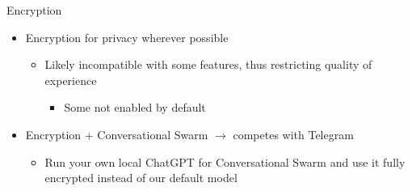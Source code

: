 \documentclass[aspectratio=169]{beamer}
\begin{document}
\begin{frame}{Encryption}
\vspace{-0.7in}
\begin{itemize}
    \item Encryption for privacy wherever possible
    \begin{itemize}
        \item Likely incompatible with some features, thus restricting quality of experience
        \begin{itemize}
            \item Some not enabled by default
        \end{itemize}
    \end{itemize}
    \item Encryption + Conversational Swarm $\rightarrow$ competes with Telegram 
    \begin{itemize}
        \item Run your own local ChatGPT for Conversational Swarm and use it fully encrypted instead of our default model
    \end{itemize}
\end{itemize}
\end{frame}
\end{document}

